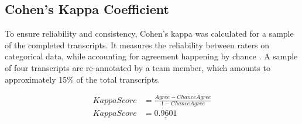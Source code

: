 \documentclass[hidelinks, 11pt]{article}
\begin{document}
\subsection{Cohen's Kappa Coefficient}
To ensure reliability and consistency, Cohen's kappa was calculated for a sample of the completed transcripts. It measures the reliability between raters on categorical data, while accounting for agreement happening by chance \cite{Cohen_1960}. A sample of four transcripts are re-annotated by a team member, which amounts to approximately 15\% of the total transcripts.









\begin{equation}
  \begin{split}
    KappaScore & = \frac{Agree - ChanceAgree}{1 - ChanceAgree} \\
    KappaScore & = \underline{\underline{0.9601}}
  \end{split}
\end{equation}
\end{document}
